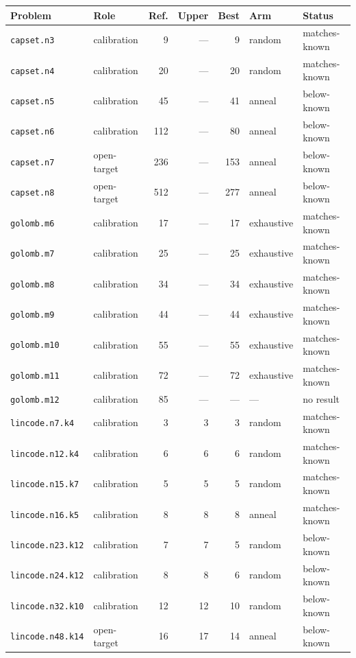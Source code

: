 \begin{longtable}{llrrrll}
\toprule
Problem & Role & Ref. & Upper & Best & Arm & Status\\
\midrule
\endhead
\texttt{capset.n3} & calibration & 9 & — & 9 & random & matches-known\\
\texttt{capset.n4} & calibration & 20 & — & 20 & random & matches-known\\
\texttt{capset.n5} & calibration & 45 & — & 41 & anneal & below-known\\
\texttt{capset.n6} & calibration & 112 & — & 80 & anneal & below-known\\
\texttt{capset.n7} & open-target & 236 & — & 153 & anneal & below-known\\
\texttt{capset.n8} & open-target & 512 & — & 277 & anneal & below-known\\
\texttt{golomb.m6} & calibration & 17 & — & 17 & exhaustive & matches-known\\
\texttt{golomb.m7} & calibration & 25 & — & 25 & exhaustive & matches-known\\
\texttt{golomb.m8} & calibration & 34 & — & 34 & exhaustive & matches-known\\
\texttt{golomb.m9} & calibration & 44 & — & 44 & exhaustive & matches-known\\
\texttt{golomb.m10} & calibration & 55 & — & 55 & exhaustive & matches-known\\
\texttt{golomb.m11} & calibration & 72 & — & 72 & exhaustive & matches-known\\
\texttt{golomb.m12} & calibration & 85 & — & — & --- & no result\\
\texttt{lincode.n7.k4} & calibration & 3 & 3 & 3 & random & matches-known\\
\texttt{lincode.n12.k4} & calibration & 6 & 6 & 6 & random & matches-known\\
\texttt{lincode.n15.k7} & calibration & 5 & 5 & 5 & random & matches-known\\
\texttt{lincode.n16.k5} & calibration & 8 & 8 & 8 & anneal & matches-known\\
\texttt{lincode.n23.k12} & calibration & 7 & 7 & 5 & random & below-known\\
\texttt{lincode.n24.k12} & calibration & 8 & 8 & 6 & random & below-known\\
\texttt{lincode.n32.k10} & calibration & 12 & 12 & 10 & random & below-known\\
\texttt{lincode.n48.k14} & open-target & 16 & 17 & 14 & anneal & below-known\\

\end{longtable}
